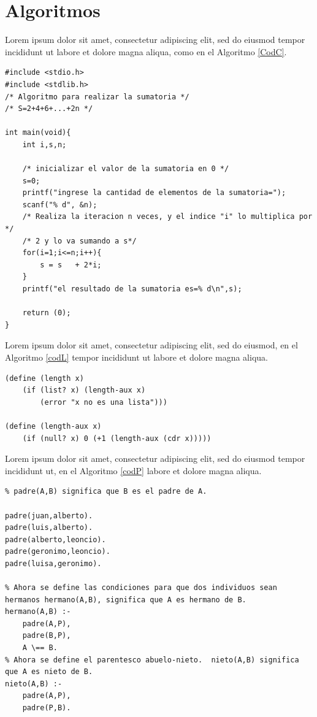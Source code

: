 \documentclass[letter,12pt]{report}
\begin{document}
\section{Algoritmos}\label{A:alg}
\blindtext %

Lorem ipsum dolor sit amet, consectetur adipiscing elit, sed do eiusmod tempor incididunt ut labore et dolore magna aliqua, como en el Algoritmo \ref{CodC}.

\lstset{language=C}
\begin{lstlisting}[caption = C\'odigo en C de una sumatoria, label = CodC]
#include <stdio.h>
#include <stdlib.h>
/* Algoritmo para realizar la sumatoria */
/* S=2+4+6+...+2n */

int main(void){
	int i,s,n;
	
	/* inicializar el valor de la sumatoria en 0 */
	s=0;
	printf("ingrese la cantidad de elementos de la sumatoria=");
	scanf("% d", &n);
	/* Realiza la iteracion n veces, y el indice "i" lo multiplica por */
	/* 2 y lo va sumando a s*/
	for(i=1;i<=n;i++){
		s = s	+ 2*i;
	} 
	printf("el resultado de la sumatoria es=% d\n",s);

	return (0);
}
\end{lstlisting}


Lorem ipsum dolor sit amet, consectetur adipiscing elit, sed do eiusmod, en el Algoritmo \ref{codL} tempor incididunt ut labore et dolore magna aliqua.

\lstset{language=LISP}
\begin{lstlisting}[caption= C\'odigo LISP de una Lista, label = codL]
(define (length x)
    (if (list? x) (length-aux x)
        (error "x no es una lista")))
        
(define (length-aux x)
    (if (null? x) 0 (+1 (length-aux (cdr x)))))
\end{lstlisting}

Lorem ipsum dolor sit amet, consectetur adipiscing elit, sed do eiusmod tempor incididunt ut, en el Algoritmo \ref{codP} labore et dolore magna aliqua.


\lstset{language=PROLOG}
\begin{lstlisting}[caption= C\'odigo PROLOG de un \'arbol geneal\'ogico, label=codP]
% Arbol genealogico version 1.
% padre(A,B) significa que B es el padre de A.

padre(juan,alberto).
padre(luis,alberto).
padre(alberto,leoncio). 
padre(geronimo,leoncio).
padre(luisa,geronimo). 

% Ahora se define las condiciones para que dos individuos sean hermanos hermano(A,B), significa que A es hermano de B.
hermano(A,B) :- 
    padre(A,P), 
    padre(B,P), 
    A \== B.
% Ahora se define el parentesco abuelo-nieto.  nieto(A,B) significa que A es nieto de B.
nieto(A,B) :- 
    padre(A,P), 
    padre(P,B). 
\end{lstlisting}
\end{document}
